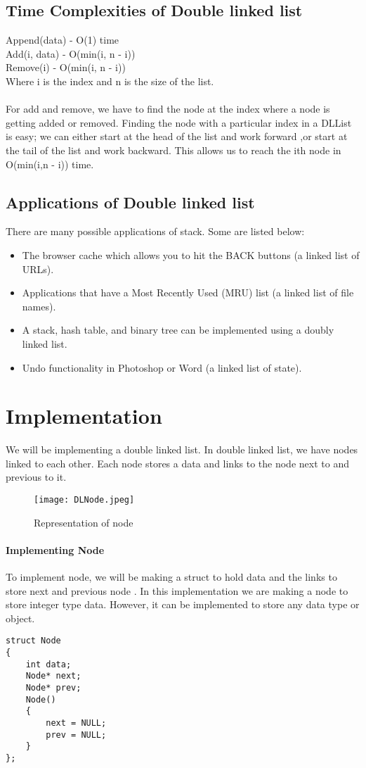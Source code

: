 \documentclass[11pt,fleqn]{book} %
\begin{document}
\subsection{Time Complexities of Double linked list}
Append(data) - O(1) time \\
Add(i, data) - O(min(i, n - i))\\
Remove(i) - O(min(i, n - i))\\ 
Where i is the index and n is the size of the list.\\ \\
For add and remove, we have to find the node at the index where a node is getting added or removed. Finding the node with a particular index in a DLList is easy; we can either start at the head of the list and work forward ,or start at the tail of the list and work backward. This allows us to reach the ith node in O(min(i,n - i)) time.
 
\subsection{Applications of Double linked list}
There are many possible applications of stack. Some are listed below:
\begin{itemize}
	\item The browser cache which allows you to hit the BACK buttons (a linked list of URLs).
	\item Applications that have a Most Recently Used (MRU) list (a linked list of file names).
	\item A stack, hash table, and binary tree can be implemented using a doubly linked list. 
	\item Undo functionality in Photoshop or Word (a linked list of state).
\end{itemize}

\section{Implementation}
We will be implementing a double linked list. In double linked list, we have nodes linked to each other.
Each node stores a data and links to the node next to and previous to it.
\begin{figure}[H]
	\centering
	\texttt{[image: DLNode.jpeg]}
	\caption{Representation of node}
\end{figure}
\paragraph{Implementing Node}
To implement node, we will be making a struct to hold data and the links to store next and previous node . In this implementation we are making a node to store integer type data. However, it can be implemented to store any data type or object.
\begin{lstlisting}
struct Node
{
	int data;
	Node* next;
	Node* prev;
	Node()
	{
		next = NULL;
		prev = NULL;
	}
};
\end{lstlisting}
\end{document}
